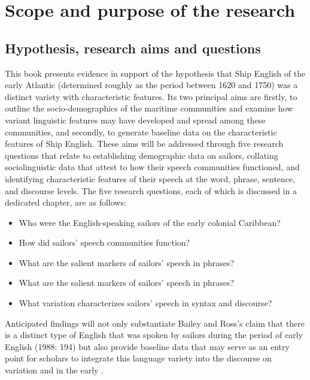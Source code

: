 \section{{Scope and purpose of the research}  }\label{sec:1.2}



\subsection{{Hypothesis, research aims and questions}}\label{sec:1.2.1}



This book presents evidence in support of the hypothesis that Ship English of the early Atlantic  (determined roughly as the period between 1620 and 1750) was a distinct variety with characteristic features. Its two principal aims are firstly, to outline the socio-demographics of the maritime communities and examine how variant linguistic features may have developed and spread among these communities, and secondly, to generate baseline data on the characteristic features of Ship English. These aims will be addressed through five research questions that relate to establishing demographic data on sailors, collating sociolinguistic data that attest to how their speech communities functioned, and identifying characteristic features of their speech at the word, phrase, sentence, and discourse levels. The five research questions, each of which is discussed in a dedicated chapter, are as follows:


\begin{itemize}
\item Who were the English-speaking sailors of the early colonial Caribbean?
\item How did sailors’ speech communities function?
\item What are the salient markers of sailors’ speech in  phrases?
\item What are the salient markers of sailors’ speech in  phrases?
\item What variation characterizes sailors’ speech in syntax and discourse?
\end{itemize}

Anticipated findings will not only substantiate Bailey and Ross’s claim that there is a distinct type of English that was spoken by sailors during the period of early English  (1988: 194) but also provide baseline data that may serve as an entry point for scholars to integrate this language variety into the discourse on  variation and  in the early . 

